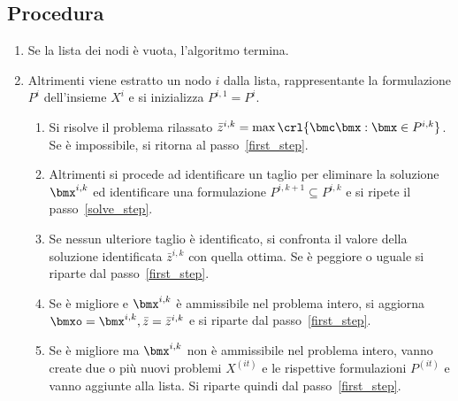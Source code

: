 \documentclass[\main/main.tex]{subfiles}
\begin{document}
\subsection{Procedura}
\begin{enumerate}
    \item Se la lista dei nodi è vuota, l'algoritmo termina.\label{first_step}
    \item Altrimenti viene estratto un nodo \(i\) dalla lista, rappresentante la formulazione \(P^i\) dell'insieme \(X^i\) e si inizializza \(P^{i,1} = P^i\).
    \begin{enumerate}
        \item Si risolve il problema rilassato \(\bar{z}^{i,k} = \max\crl{\bmc\bmx: \bmx \in P^{i,k}}\). Se è impossibile, si ritorna al passo~\ref{first_step}.\label{solve_step}
        \item Altrimenti si procede ad identificare un taglio per eliminare la soluzione \(\bmx^{i,k}\) ed identificare una formulazione \(P^{i,k+1} \subseteq P^{i,k}\) e si ripete il passo~\ref{solve_step}.
        \item Se nessun ulteriore taglio è identificato, si confronta il valore della soluzione identificata \(\bar{z}^{i,k}\) con quella ottima. Se è peggiore o uguale si riparte dal passo~\ref{first_step}.
        \item Se è migliore e \(\bmx^{i,k}\) è ammissibile nel problema intero, si aggiorna \(\bmxo = \bmx^{i,k}, \bar{z} = \bar{z}^{i,k}\) e si riparte dal passo~\ref{first_step}.
        \item Se è migliore ma \(\bmx^{i,k}\) non è ammissibile nel problema intero, vanno create due o più nuovi problemi \(X^{(it)}\) e le rispettive formulazioni \(P^{(it)}\) e vanno aggiunte alla lista. Si riparte quindi dal passo~\ref{first_step}.
    \end{enumerate}
\end{enumerate}
\end{document}
